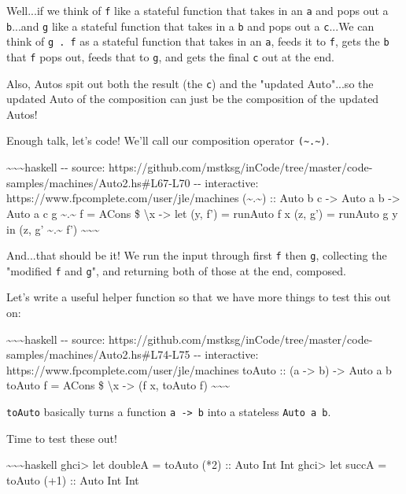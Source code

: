 \documentclass[]{article}
\begin{document}
Well...if we think of \texttt{f} like a stateful function that takes in an
\texttt{a} and pops out a \texttt{b}...and \texttt{g} like a stateful function
that takes in a \texttt{b} and pops out a \texttt{c}...We can think of
\texttt{g\ .\ f} as a stateful function that takes in an \texttt{a}, feeds it to
\texttt{f}, gets the \texttt{b} that \texttt{f} pops out, feeds that to
\texttt{g}, and gets the final \texttt{c} out at the end.

Also, Autos spit out both the result (the \texttt{c}) and the "updated
Auto"...so the updated Auto of the composition can just be the composition of
the updated Autos!

Enough talk, let's code! We'll call our composition operator
\texttt{(\textasciitilde{}.\textasciitilde{})}.

\textasciitilde{}\textasciitilde{}\textasciitilde{}haskell -\/- source:
https://github.com/mstksg/inCode/tree/master/code-samples/machines/Auto2.hs\#L67-L70
-\/- interactive: https://www.fpcomplete.com/user/jle/machines
(\textasciitilde{}.\textasciitilde{}) :: Auto b c -\textgreater{} Auto a b
-\textgreater{} Auto a c g \textasciitilde{}.\textasciitilde{} f = ACons \$
\textbackslash{}x -\textgreater{} let (y, f') = runAuto f x (z, g') = runAuto g
y in (z, g' \textasciitilde{}.\textasciitilde{} f')
\textasciitilde{}\textasciitilde{}\textasciitilde{}

And...that should be it! We run the input through first \texttt{f} then
\texttt{g}, collecting the "modified \texttt{f} and \texttt{g}", and returning
both of those at the end, composed.

Let's write a useful helper function so that we have more things to test this
out on:

\textasciitilde{}\textasciitilde{}\textasciitilde{}haskell -\/- source:
https://github.com/mstksg/inCode/tree/master/code-samples/machines/Auto2.hs\#L74-L75
-\/- interactive: https://www.fpcomplete.com/user/jle/machines toAuto :: (a
-\textgreater{} b) -\textgreater{} Auto a b toAuto f = ACons \$
\textbackslash{}x -\textgreater{} (f x, toAuto f)
\textasciitilde{}\textasciitilde{}\textasciitilde{}

\texttt{toAuto} basically turns a function \texttt{a\ -\textgreater{}\ b} into a
stateless \texttt{Auto\ a\ b}.

Time to test these out!

\textasciitilde{}\textasciitilde{}\textasciitilde{}haskell ghci\textgreater{}
let doubleA = toAuto (*2) :: Auto Int Int ghci\textgreater{} let succA = toAuto
(+1) :: Auto Int Int
\end{document}
